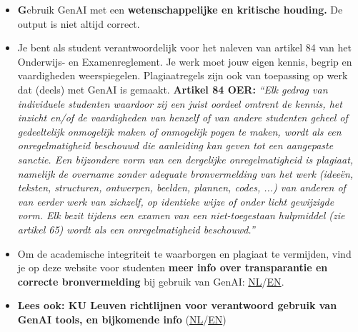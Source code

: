 \begin{itemize}
    \item \textbf Gebruik GenAI met een \textbf{wetenschappelijke en kritische houding.} De output is niet altijd correct.
    
    \item Je bent als student verantwoordelijk voor het naleven van artikel 84 van het Onderwijs- en Examenreglement. Je werk moet jouw eigen kennis, begrip en vaardigheden weerspiegelen. Plagiaatregels zijn ook van toepassing op werk dat (deels) met GenAI is gemaakt. 
    \newline
    \textbf{Artikel 84 OER:} \textit{“Elk gedrag van individuele studenten waardoor zij een juist oordeel omtrent de kennis, het inzicht en/of de vaardigheden van henzelf of van andere studenten geheel of gedeeltelijk onmogelijk maken of onmogelijk pogen te maken, wordt als een onregelmatigheid beschouwd die aanleiding kan geven tot een aangepaste sanctie. Een bijzondere vorm van een dergelijke onregelmatigheid is plagiaat, namelijk de overname zonder adequate bronvermelding van het werk (ideeën, teksten, structuren, ontwerpen, beelden, plannen, codes, ...) van anderen of van eerder werk van zichzelf, op identieke wijze of onder licht gewijzigde vorm. Elk bezit tijdens een examen van een niet-toegestaan hulpmiddel (zie artikel 65) wordt als een onregelmatigheid beschouwd.”}
    
    \item Om de academische integriteit te waarborgen en plagiaat te vermijden, vind je op deze website voor studenten \textbf{meer info over transparantie en correcte bronvermelding} bij gebruik van GenAI: \href{https://www.kuleuven.be/onderwijs/student/onderwijstools/artificiele-intelligentie#Transparantie}{NL}/\href{https://www.kuleuven.be/english/education/student/educational-tools/generative-artificial-intelligence#Transparency}{EN}.
    \item \textbf{Lees ook: KU Leuven richtlijnen voor verantwoord gebruik van GenAI tools, en bijkomende info }(\href{https://www.kuleuven.be/genai}{NL}/\href{https://www.kuleuven.be/english/genai}{EN})
\end{itemize}

